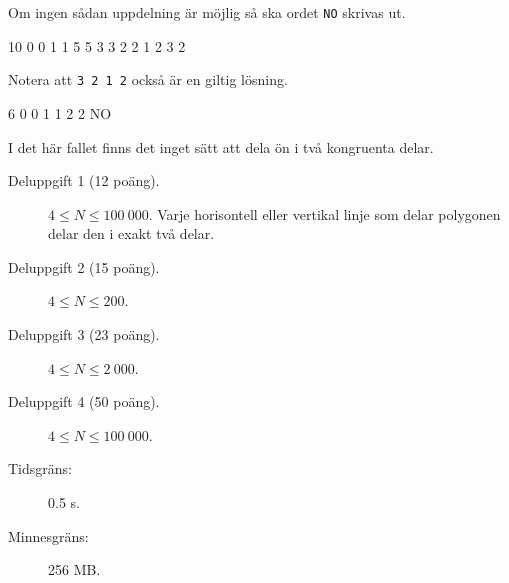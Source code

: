 \documentclass{boi2014-se}
\newcommand{\constant}[1]{{\tt #1}}
\begin{document}
    Om ingen sådan uppdelning är möjlig så ska ordet \constant{NO}
    skrivas ut.

    \clearpage

    \Examples
	\example
	{
		10   0  0  1  1  5  5  3  3  2  2
	}
	{
		1 2 3 2
	}
	{
        Notera att {\tt 3 2 1 2} också är en giltig lösning.

        \begin{center}
        \end{center}
	}

	\example
	{
		6  0  0  1  1  2  2
	}
	{
		NO
    }
    {
        I det här fallet finns det inget sätt att dela ön i två kongruenta
        delar.
        \begin{center}
        \end{center}
	}

    \Scoring

    \begin{description}
        \item[Deluppgift 1 (12 poäng).] $4 \le N \le 100\ 000$.
        Varje horisontell eller vertikal linje som delar polygonen delar den i
        exakt två delar.
        
        \item[Deluppgift 2 (15 poäng).] $4 \le N \le 200$.
        \item[Deluppgift 3 (23 poäng).] $4 \le N \le 2\ 000$.
        \item[Deluppgift 4 (50 poäng).] $4 \le N \le 100\ 000$.
    \end{description}

    \Constraints

    \begin{description}
        \item[Tidsgräns:] 0.5 s.
        \item[Minnesgräns:] 256 MB.
    \end{description}
\end{document}
